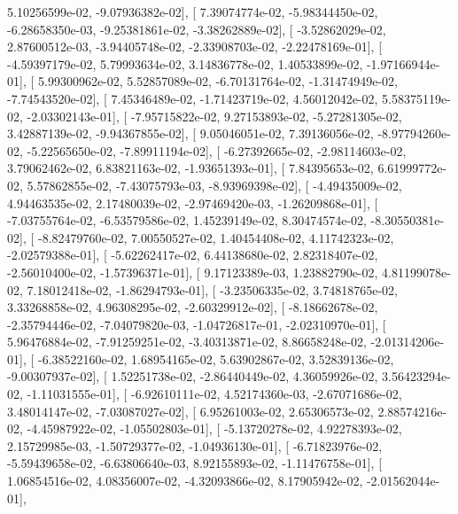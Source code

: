 \documentclass{article}
\begin{document}
          5.10256599e-02,  -9.07936382e-02],
       [  7.39074774e-02,  -5.98344450e-02,  -6.28658350e-03,
         -9.25381861e-02,  -3.38262889e-02],
       [ -3.52862029e-02,   2.87600512e-03,  -3.94405748e-02,
         -2.33908703e-02,  -2.22478169e-01],
       [ -4.59397179e-02,   5.79993634e-02,   3.14836778e-02,
          1.40533899e-02,  -1.97166944e-01],
       [  5.99300962e-02,   5.52857089e-02,  -6.70131764e-02,
         -1.31474949e-02,  -7.74543520e-02],
       [  7.45346489e-02,  -1.71423719e-02,   4.56012042e-02,
          5.58375119e-02,  -2.03302143e-01],
       [ -7.95715822e-02,   9.27153893e-02,  -5.27281305e-02,
          3.42887139e-02,  -9.94367855e-02],
       [  9.05046051e-02,   7.39136056e-02,  -8.97794260e-02,
         -5.22565650e-02,  -7.89911194e-02],
       [ -6.27392665e-02,  -2.98114603e-02,   3.79062462e-02,
          6.83821163e-02,  -1.93651393e-01],
       [  7.84395653e-02,   6.61999772e-02,   5.57862855e-02,
         -7.43075793e-03,  -8.93969398e-02],
       [ -4.49435009e-02,   4.94463535e-02,   2.17480039e-02,
         -2.97469420e-03,  -1.26209868e-01],
       [ -7.03755764e-02,  -6.53579586e-02,   1.45239149e-02,
          8.30474574e-02,  -8.30550381e-02],
       [ -8.82479760e-02,   7.00550527e-02,   1.40454408e-02,
          4.11742323e-02,  -2.02579388e-01],
       [ -5.62262417e-02,   6.44138680e-02,   2.82318407e-02,
         -2.56010400e-02,  -1.57396371e-01],
       [  9.17123389e-03,   1.23882790e-02,   4.81199078e-02,
          7.18012418e-02,  -1.86294793e-01],
       [ -3.23506335e-02,   3.74818765e-02,   3.33268858e-02,
          4.96308295e-02,  -2.60329912e-02],
       [ -8.18662678e-02,  -2.35794446e-02,  -7.04079820e-03,
         -1.04726817e-01,  -2.02310970e-01],
       [  5.96476884e-02,  -7.91259251e-02,  -3.40313871e-02,
          8.86658248e-02,  -2.01314206e-01],
       [ -6.38522160e-02,   1.68954165e-02,   5.63902867e-02,
          3.52839136e-02,  -9.00307937e-02],
       [  1.52251738e-02,  -2.86440449e-02,   4.36059926e-02,
          3.56423294e-02,  -1.11031555e-01],
       [ -6.92610111e-02,   4.52174360e-03,  -2.67071686e-02,
          3.48014147e-02,  -7.03087027e-02],
       [  6.95261003e-02,   2.65306573e-02,   2.88574216e-02,
         -4.45987922e-02,  -1.05502803e-01],
       [ -5.13720278e-02,   4.92278393e-02,   2.15729985e-03,
         -1.50729377e-02,  -1.04936130e-01],
       [ -6.71823976e-02,  -5.59439658e-02,  -6.63806640e-03,
          8.92155893e-02,  -1.11476758e-01],
       [  1.06854516e-02,   4.08356007e-02,  -4.32093866e-02,
          8.17905942e-02,  -2.01562044e-01],
\end{document}
